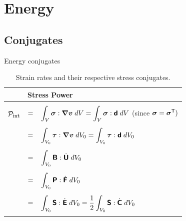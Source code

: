 \chapter{Energy}
\section{Conjugates}
\label{section:conjugates}
Energy conjugates

\begin{table}[htb]
\begin{center}
\begin{tabular}{|cl|} \hline
     & {\bf Stress Power} \\ \hline \hline
     &  \\
 $\mathcal{P}_{\mbox{\footnotesize int}}$ 
   & $=\;\;\;\displaystyle\int_{V} \mbox{\boldmath $\sigma$} : \mbox{\boldmath $\nabla$}\mbox{\boldmath $v$} \; dV 
            =\displaystyle\int_{V} \mbox{\boldmath $\sigma$} : \mbox{\sffamily\bfseries d}  \; dV $ (since $\mbox{\boldmath $\sigma$} = \mbox{\boldmath $\sigma$}^{\mbox{\scriptsize \sffamily T}})$ \\
   & \\
   & $=\;\;\;\displaystyle\int_{V_0} \mbox{\boldmath $\tau$} : \mbox{\boldmath $\nabla$}\mbox{\boldmath $v$} \; dV_0 
            =\displaystyle\int_{V_0} \mbox{\boldmath $\tau$} : \mbox{\sffamily\bfseries d}  \; dV_0 $ \\
   & \\ 
   & $=\;\;\;\displaystyle\int_{V_0} \mbox{\sffamily\bfseries B} : \dot{\mbox{\sffamily\bfseries U}} \; dV_0 $ \\
   & \\ 
   & $=\;\;\;\displaystyle\int_{V_0} \mbox{\sffamily\bfseries P} : \dot{\mbox{\sffamily\bfseries F}} \; dV_0 $ \\
   & \\ 
   & $=\;\;\;\displaystyle\int_{V_0} \mbox{\sffamily\bfseries S} : \dot{\mbox{\sffamily\bfseries E}} \; dV_0 
            =\frac{1}{2} \displaystyle\int_{V_0} \mbox{\sffamily\bfseries S} : \dot{\mbox{\sffamily\bfseries C}} \; dV_0 $ \\
   & \\ \hline
\end{tabular}
\end{center}
\caption{Strain rates  
and their respective stress conjugates.}
\label{tab:table_of_conjugate_power}
\end{table}

